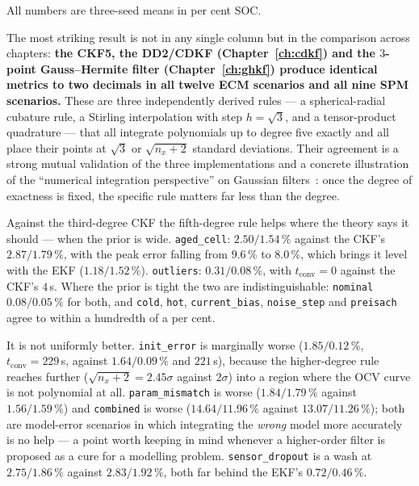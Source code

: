 All numbers are three-seed means in per cent SOC.

The most striking result is not in any single column but in the comparison across chapters:
\textbf{the CKF5, the DD2/CDKF (Chapter~\ref{ch:cdkf}) and the $3$-point Gauss--Hermite filter
(Chapter~\ref{ch:ghkf}) produce identical metrics to two decimals in all twelve ECM scenarios
and all nine SPM scenarios.} These are three independently derived rules --- a spherical-radial
cubature rule, a Stirling interpolation with step $h = \sqrt3$, and a tensor-product quadrature
--- that all integrate polynomials up to degree five exactly and all place their points at
$\sqrt3$ or $\sqrt{n_x+2}$ standard deviations. Their agreement is a strong mutual validation
of the three implementations and a concrete illustration of the ``numerical integration
perspective'' on Gaussian filters~\cite{wu2006numerical}: once the degree of exactness is
fixed, the specific rule matters far less than the degree.

Against the third-degree CKF the fifth-degree rule helps where the theory says it should ---
when the prior is wide. \texttt{aged\_cell}: $2.50/1.54\,\%$ against the CKF's $2.87/1.79\,\%$,
with the peak error falling from $9.6\,\%$ to $8.0\,\%$, which brings it level with the EKF
($1.18/1.52\,\%$). \texttt{outliers}: $0.31/0.08\,\%$, with $t_{\text{conv}} = 0$ against the
CKF's $4$\,s. Where the prior is tight the two are indistinguishable: \texttt{nominal}
$0.08/0.05\,\%$ for both, and \texttt{cold}, \texttt{hot}, \texttt{current\_bias},
\texttt{noise\_step} and \texttt{preisach} agree to within a hundredth of a per cent.

It is not uniformly better. \texttt{init\_error} is marginally worse ($1.85/0.12\,\%$,
$t_{\text{conv}} = 229$\,s, against $1.64/0.09\,\%$ and $221$\,s), because the higher-degree
rule reaches further ($\sqrt{n_x+2} = 2.45\sigma$ against $2\sigma$) into a region where the
OCV curve is not polynomial at all. \texttt{param\_mismatch} is worse ($1.84/1.79\,\%$ against
$1.56/1.59\,\%$) and \texttt{combined} is worse ($14.64/11.96\,\%$ against $13.07/11.26\,\%$);
both are model-error scenarios in which integrating the \emph{wrong} model more accurately is
no help --- a point worth keeping in mind whenever a higher-order filter is proposed as a cure
for a modelling problem. \texttt{sensor\_dropout} is a wash at $2.75/1.86\,\%$ against
$2.83/1.92\,\%$, both far behind the EKF's $0.72/0.46\,\%$.

